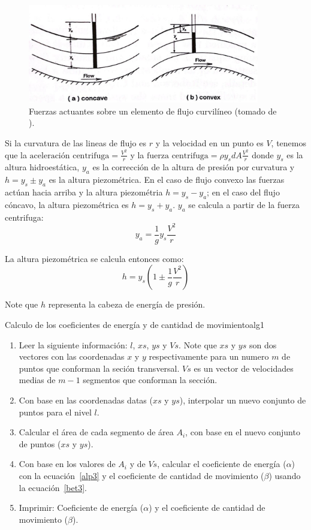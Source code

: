 \documentclass[11pt, oneside]{article}
\begin{document}
\begin{figure}[h]
\centering
\includegraphics[width=0.9\textwidth]{fig8.jpeg}
\caption{Fuerzas actuantes sobre un elemento de flujo curvil\'ineo (tomado de \cite{Chau}).}
\label{fig8}
\end{figure}

Si la curvatura de las lineas de flujo es $r$ y la velocidad en un punto es  $V$, tenemos que la $\text{aceleración centrifuga}= \frac{V^2}{r}$ y la $\text{fuerza centrifuga}= \rho y_s dA \frac{V^2}{r}$ donde $y_s$ es la altura hidroest\'atica, $y_a$ es la corrección de la altura de presi\'on por curvatura y $h = y_s \pm y_a$ es la altura piezom\'etrica. En el caso de flujo convexo las fuerzas actúan hacia arriba y la altura piezom\'etria $h = y_s-y_a$; en el caso del flujo cóncavo, la altura piezom\'etrica es $h = y_s+y_a$. $y_a$ se calcula a partir de la fuerza centrifuga:
$$
y_a = \frac{1}{g}y_s \frac{V^2}{r}
$$

La altura piezom\'etrica se calcula entonces como:
$$
h = y_s \left( 1 \pm \frac{1}{g} \frac{V^2}{r} \right)
$$

Note que $h$ representa la cabeza de energ\'ia de presi\'on. 

\begin{alg}{Calculo de los coeficientes de energ\'ia y de cantidad de movimiento}{alg1}
\begin{enumerate}
\item Leer la siguiente informaci\'on: $l$, $xs$, $ys$ y $Vs$. Note que $xs$ y $ys$ son dos vectores con las coordenadas $x$ y $y$ respectivamente para un numero $m$ de puntos que conforman la seci\'on transversal. $Vs$ es un vector de velocidades medias de $m-1$ segmentos que conforman la secci\'on.
\item Con base en las coordenadas datas ($xs$ y $ys$), interpolar un nuevo conjunto de puntos para el nivel $l$.   
\item Calcular el \'area de cada segmento de \'area $A_i$, con base en el nuevo conjunto de puntos ($xs$ y $ys$).
\item Con base en los valores de $A_i$ y de $Vs$, calcular el coeficiente de energ\'ia ($\alpha$) con la ecuaci\'on~\ref{alp3} y el coeficiente de cantidad de movimiento ($\beta$) usando la ecuaci\'on~\ref{bet3}.
\item Imprimir: Coeficiente de energ\'ia ($\alpha$) y el coeficiente de cantidad de movimiento ($\beta$). 
\end{enumerate}
\end{alg}
\end{document}
